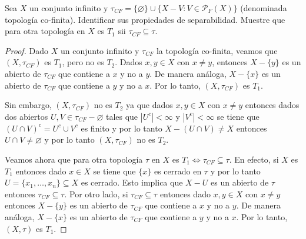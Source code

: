 \documentclass{article}
\theoremstyle{definition}
\newcommand{\sii}{\iff}                          %
\newenvironment{ejercicio}[1]{\begin{trivlist}
\item[\hskip \labelsep {\bfseries Ejercicio}\hskip \labelsep {\bfseries #1.}]}{\end{trivlist}}
\begin{document}
\begin{ejercicio}{6}
    Sea \(X\) un conjunto infinito y \( \tau_{CF} = \{ \varnothing \} \cup \{ X-V : V \in \mathcal{P}_{F}(X) \} \) (denominada topología co-finita). Identificar sus propiedades de separabilidad.
    Muestre que para otra topología en \(X\) es \(T_{1}\) sii \( \tau_{CF} \subseteq \tau \).
\end{ejercicio}
\begin{proof}
    Dado \( X \) un conjunto infinito y \( \tau_{CF} \) la topología co-finita, veamos que \( (X, \tau_{CF}) \) es \( T_1 \), pero no es \( T_2 \). Dados \( x, y \in X \) con \( x \neq y \), entonces
    \( X - \{ y \} \) es un abierto de \( \tau_{CF} \) que contiene a \( x \) y no a \( y \). De manera análoga, \( X - \{ x \} \) es un abierto de \( \tau_{CF} \) que contiene a \( y \) y no a \( x \). Por lo tanto, \( (X, \tau_{CF}) \) es \( T_1 \).

    Sin embargo, \( (X, \tau_{CF}) \) no es \( T_2 \) ya que dados \( x, y \in X \) con \( x \neq y \) entonces dados dos abiertos \( U, V \in \tau_{CF} - \varnothing \) tales que \( |U^c| < \infty \) y \( |V^c| < \infty \) se tiene que
    \( {(U \cap V)}^c = U^c \cup V^c \) es finito y por lo tanto \( X - (U \cap V) \neq X \) entonces \( U \cap V \neq \varnothing \) y por lo tanto \( (X, \tau_{CF}) \) no es \( T_2 \).

    Veamos ahora que para otra topología \( \tau \) en \( X \) es \( T_1 \sii \tau_{CF} \subseteq \tau \).
    En efecto, si \( X \) es \( T_1 \) entonces dado \( x \in X \) se tiene que \( \{ x \} \) es cerrado en \( \tau \) y por lo tanto \( U = \{ x_1, \ldots, x_n \} \subseteq X \) es cerrado. Esto implica que \( X - U \) es un abierto de \( \tau \) entonces \( \tau_{CF} \subseteq \tau \).
    Por otro lado, si \( \tau_{CF} \subseteq \tau \) entonces dado \( x, y \in X \) con \( x \neq y \) entonces \( X - \{ y \} \) es un abierto de \( \tau_{CF} \) que contiene a \( x \) y no a \( y \). De manera análoga, \( X - \{ x \} \) es un abierto de \( \tau_{CF} \) que contiene a \( y \) y no a \( x \). Por lo tanto, \( (X, \tau) \) es \( T_1 \).
\end{proof}
\end{document}
